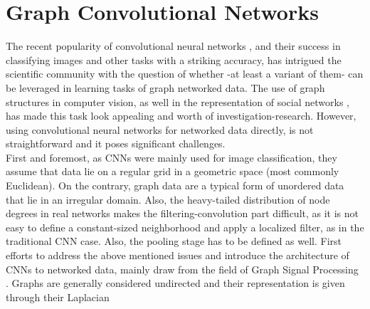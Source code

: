 \section{Graph Convolutional Networks}

The recent popularity of convolutional neural networks \cite{40k}, and their
success in classifying images and other tasks with a striking accuracy, has intrigued the scientific
community with the question of whether -at least a variant of them- can be leveraged in learning tasks
of graph networked data. The use of graph structures in computer
vision\cite{survey}, as well in the representation of social networks
\cite{kleinberg_book}, has made this task look appealing and worth of investigation-research.
However, using convolutional neural networks for
networked data directly, is not straightforward and it poses significant
challenges.\\
 First and foremost,
as CNNs were mainly used for image classification, they assume that
data lie on a regular grid in a geometric space (most commonly
Euclidean). On the contrary, graph data are a typical form of unordered data that lie in
an irregular domain. Also, the heavy-tailed distribution of node degrees
in real networks \cite{smth} makes the filtering-convolution part difficult,
as it is not easy to define a constant-sized neighborhood and apply a
localized filter, as in the traditional CNN case. Also, the pooling stage has to
be defined as well.
 First efforts to address the above mentioned issues
\cite{Lecun} and introduce the architecture of CNNs to networked data,
mainly draw from the field of Graph Signal Processing \cite{shuman}.
Graphs are generally considered undirected and their representation is given through their Laplacian
